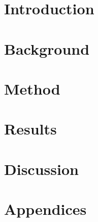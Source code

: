 \documentclass[11pt, a4paper]{article}
\begin{document}
\newpage

\begin{spacing}{0.0}
\tableofcontents
\end{spacing}

\thispagestyle{empty}

\newpage
\setcounter{page}{1}

\section{Introduction}
\label{sec:intro}


\newpage

\section{Background}
\label{sec:background}


\newpage

\section{Method}
\label{sec:method}


\newpage

\section{Results}
\label{sec:results}


\newpage

\section{Discussion}
\label{sec:discussion}


\newpage



\newpage
\section{Appendices}

\end{document}
